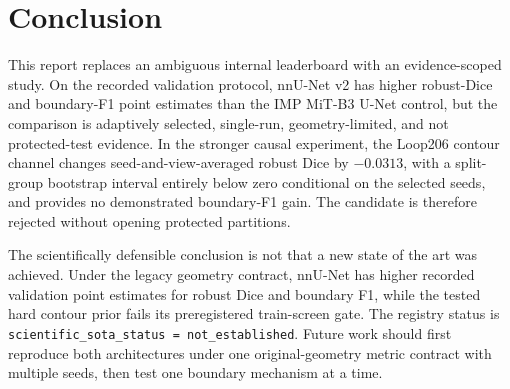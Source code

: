 \section{Conclusion}

This report replaces an ambiguous internal leaderboard with an evidence-scoped study. On the recorded \cleanv{} validation protocol, nnU-Net v2 has higher robust-Dice and boundary-F1 point estimates than the IMP MiT-B3 U-Net control, but the comparison is adaptively selected, single-run, geometry-limited, and not protected-test evidence. In the stronger causal experiment, the Loop206 contour channel changes seed-and-view-averaged robust Dice by $-0.0313$, with a split-group bootstrap interval entirely below zero conditional on the selected seeds, and provides no demonstrated boundary-F1 gain. The candidate is therefore rejected without opening protected partitions.

The scientifically defensible conclusion is not that a new state of the art was achieved. Under the legacy geometry contract, nnU-Net has higher recorded validation point estimates for robust Dice and boundary F1, while the tested hard contour prior fails its preregistered train-screen gate. The registry status is \verb|scientific_sota_status = not_established|. Future work should first reproduce both architectures under one original-geometry metric contract with multiple seeds, then test one boundary mechanism at a time.
